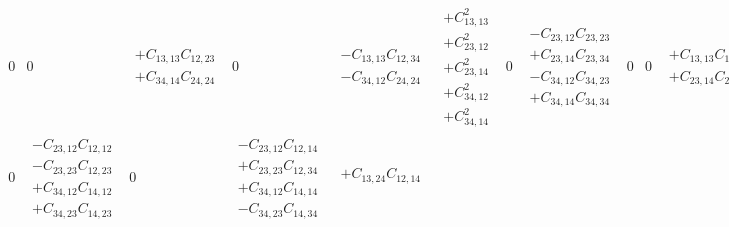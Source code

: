 \documentclass[pra,nofootinbib]{revtex4-1}
\newcommand{\C}[2]{C_{{#1},{#2}}}
\begin{document}
\begin{eqnarray}
\begin{array}{cccccccccccccccc}
     0 &
     0 &
     \begin{array}{c}
     + \C{13}{13}\C{12}{23} \\
     + \C{34}{14}\C{24}{24}
     \end{array} &
     0 &
     \begin{array}{c}
     - \C{13}{13}\C{12}{34} \\
     - \C{34}{12}\C{24}{24}
     \end{array} &
     \begin{array}{c}
     + \C{13}{13}^2 \\
     + \C{23}{12}^2 \\
     + \C{23}{14}^2 \\
     + \C{34}{12}^2 \\
     + \C{34}{14}^2
     \end{array} &
     0 &
     \begin{array}{c}
     - \C{23}{12}\C{23}{23} \\
     + \C{23}{14}\C{23}{34} \\
     - \C{34}{12}\C{34}{23} \\
     + \C{34}{14}\C{34}{34}
     \end{array} &
     0 &
     0 &
     \begin{array}{c}
     + \C{13}{13}\C{14}{23} \\
     + \C{23}{14}\C{24}{24}
     \end{array} &
     0 &
     \begin{array}{c}
     - \C{13}{13}\C{14}{34} \\
     - \C{23}{12}\C{24}{24} 
     \end{array} \\
     0 &
     \begin{array}{c}
     - \C{23}{12}\C{12}{12} \\
     - \C{23}{23}\C{12}{23} \\
     + \C{34}{12}\C{14}{12} \\
     + \C{34}{23}\C{14}{23}
     \end{array} &
     0 &
     \begin{array}{c}
     - \C{23}{12}\C{12}{14} \\
     + \C{23}{23}\C{12}{34} \\
     + \C{34}{12}\C{14}{14} \\
     - \C{34}{23}\C{14}{34}
     \end{array} &
     \begin{array}{c}
     + \C{13}{24}\C{12}{14} \\

\end{array}
\end{array}
\end{eqnarray}
\end{document}
